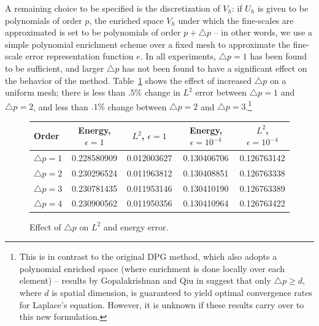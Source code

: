 \documentclass[final,leqno]{siamltex}
\begin{document}
A remaining choice to be specified is the discretization of $V_h$: if $U_h$ is given to be polynomials of order $p$, the enriched space $V_h$ under which the fine-scales are approximated is set to be polynomials of order $p+\triangle p$ -- in other words, we use a simple polynomial enrichment scheme over a fixed mesh to approximate the fine-scale error representation function $e$.  In all experiments, $\triangle p = 1$ has been found to be sufficient, and larger $\triangle p$ has not been found to have a significant effect on the behavior of the method.  Table~\ref{tab:dp} shows the effect of increased $\triangle p$ on a uniform mesh; there is less than $.5\%$ change in $L^2$ error between $\triangle p = 1$ and $\triangle p=2$, and less than $.1\%$ change between $\triangle p=2$ and $\triangle p = 3$.\footnote{This is in contrast to the original DPG method, which also adopts a polynomial enriched space (where enrichment is done locally over each element) -- results by Gopalakrishnan and Qiu in \cite{practicalDPG} suggest that only $\triangle p \geq d$, where $d$ is spatial dimension, is guaranteed to yield optimal convergence rates for Laplace's equation. However, it is unknown if these results carry over to this new formulation.}


\begin{figure}[!h]
\centering
  \begin{tabular}{| l || c | c | c | c| }
   \hline
    Order & Energy, $\epsilon=1$ & $L^2$, $\epsilon=1$  & Energy, $\epsilon=10^{-4}$ & $L^2$, $\epsilon=10^{-4}$\\
    \hline
    $\triangle p=1$ & 0.228580909 &  0.012003627 & 0.130406706 & 0.126763142
    \\ \hline
    $\triangle p=2$ &    0.230296524 &  0.011963812 & 0.130408851&    0.126763338
    \\ \hline
    $\triangle p=3$ &     0.230781435 & 0.011953146  &    0.130410190 &   0.126763389
    \\ \hline
    $\triangle p=4$ &    0.230900562 &  0.011950356 &   0.130410964 &  0.126763422
    \\ \hline
  \end{tabular}
\caption{Effect of $\triangle p$ on $L^2$ and energy error.}
\label{tab:dp}
\end{figure}
\end{document}
